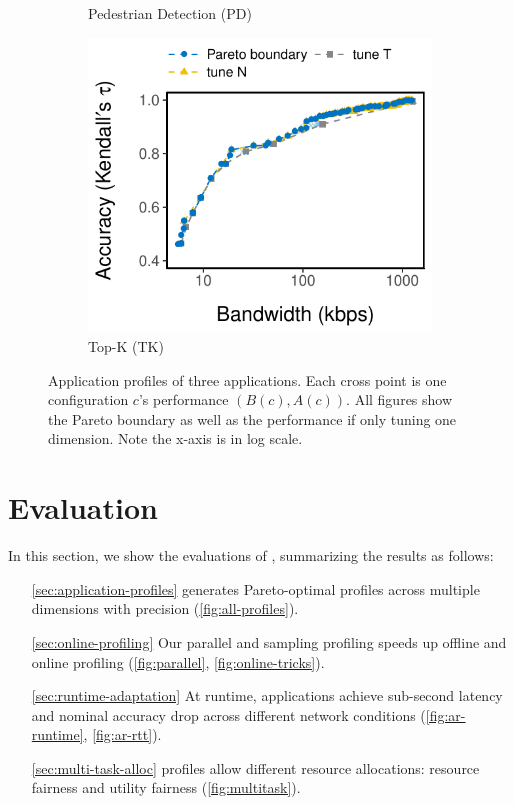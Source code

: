 \begin{figure}[htb]
\begin{subfigure}[t]{0.32\textwidth}
    \caption{Pedestrian Detection (PD)}
    \label{fig:pd-profile}
  \end{subfigure}
  \hfill
  \begin{subfigure}[t]{0.32\textwidth}
    \centering
    \includegraphics[width=\textwidth]{figures/profile-topk.pdf}
    \caption{Top-K (TK)}
    \label{fig:tk-profile}
  \end{subfigure}
  \caption{Application profiles of three applications. Each cross point is one
    configuration $c$'s performance $(B(c), A(c))$. All figures show the Pareto
    boundary as well as the performance if only tuning one dimension. Note the
    x-axis is in log scale.}
  \label{fig:all-profiles}
\end{figure}

\section{Evaluation}
\label{sec:evaluation}

In this section, we show the evaluations of \sysname{}, summarizing the results
as follows:

\begin{itemize}[itemsep=0pt, topsep=3pt]
\item[\autoref{sec:application-profiles}] \sysname{} generates Pareto-optimal
  profiles across multiple dimensions with precision
  (\autoref{fig:all-profiles}).
\item[\autoref{sec:online-profiling}] Our parallel and sampling profiling speeds
  up offline and online profiling (\autoref{fig:parallel},
  \autoref{fig:online-tricks}).
\item[\autoref{sec:runtime-adaptation}] At runtime, \sysname{} applications
  achieve sub-second latency and nominal accuracy drop across different network
  conditions (\autoref{fig:ar-runtime}, \autoref{fig:ar-rtt}).
\item[\autoref{sec:multi-task-alloc}] \sysname{} profiles allow different
  resource allocations: resource fairness and utility fairness
  (\autoref{fig:multitask}).
\end{itemize}

